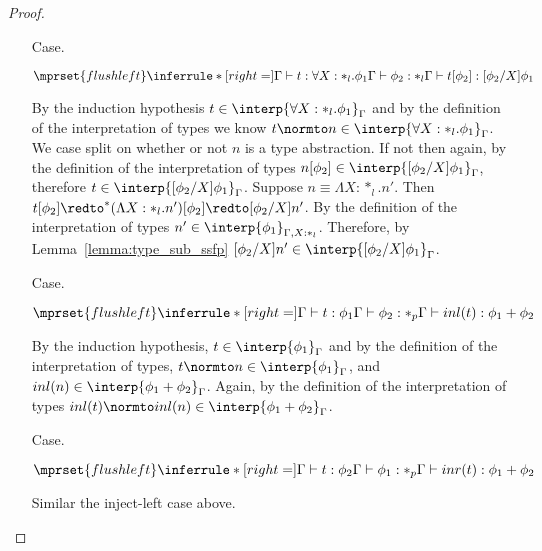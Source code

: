 \begin{proof}
\begin{itemize}
\item[Case.]\ \\
  \begin{center}
    \begin{math}
      $$\mprset{flushleft}
      \inferrule* [right=] {
        \Gamma \vdash t:\forall X:*_l.\phi_1
        \\
        \Gamma \vdash \phi_2:*_l
      }{\Gamma \vdash t[\phi_2]: [\phi_2/X]\phi_1}
    \end{math}
  \end{center}
  By the induction hypothesis $t \in \interp{\forall X:*_l.\phi_1}_\Gamma$ and by the 
  definition of the interpretation of types we know 
  $t \normto n \in \interp{\forall X:*_l.\phi_1}_\Gamma$.  We case
  split on whether or not $n$ is a type abstraction. If not then again, by the 
  definition of the interpretation of types 
  $n[\phi_2] \in \interp{[\phi_2/X]\phi_1}_\Gamma$, therefore 
  $t \in \interp{[\phi_2/X]\phi_1}_\Gamma$.  Suppose $n \equiv \Lambda X:*_l.n'$.  Then 
  $t[\phi_2] \redto^* (\Lambda X:*_l.n')[\phi_2] \redto [\phi_2/X]n'$.  By the definition 
  of the interpretation of types $n' \in \interp{\phi_1}_{\Gamma,X:*_l}$. Therefore, by
  Lemma~\ref{lemma:type_sub_ssfp} $[\phi_2/X]n' \in \interp{[\phi_2/X]\phi_1}_{\Gamma}$.
  
\item[Case.]\ \\
  \begin{center}
    \begin{math}
      $$\mprset{flushleft}
      \inferrule* [right=] {
        \Gamma \vdash t:\phi_1
	\\
	\Gamma \vdash \phi_2:*_p
      }{\Gamma \vdash inl(t): \phi_1+\phi_2}
    \end{math}
  \end{center}
  By the induction hypothesis, $t \in \interp{\phi_1}_\Gamma$ and by the definition of the 
  interpretation of types,
  $t \normto n \in \interp{\phi_1}_\Gamma$, and $inl(n) \in \interp{\phi_1 + \phi_2}_{\Gamma}$.  
  Again, by the definition of the interpretation of types
  $inl(t) \normto inl(n) \in \interp{\phi_1 + \phi_2}_\Gamma$.
  
\item[Case.]\ \\
  \begin{center}
    \begin{math}
      $$\mprset{flushleft}
      \inferrule* [right=] {
        \Gamma \vdash t:\phi_2
	\\
	\Gamma \vdash \phi_1:*_p
      }{\Gamma \vdash inr(t): \phi_1+\phi_2}
    \end{math}
  \end{center}
  Similar the inject-left case above.
  

\end{itemize}
\end{proof}
